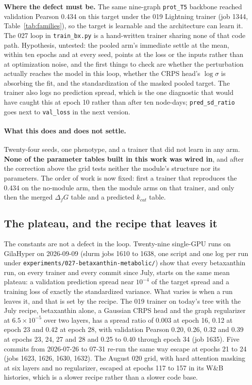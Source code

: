 \textbf{Where the defect must be.} The same nine-graph \texttt{prot\_T5} backbone reached
validation Pearson 0.434 on this target under the 019 Lightning trainer (job 1344,
Table~\ref{tab:families}), so the target is learnable and the architecture can learn it.
The 027 loop in \texttt{train\_bx.py} is a hand-written trainer sharing none of that code
path. Hypothesis, untested: the pooled arm's immediate settle at the mean, within ten
epochs and at every seed, points at the loss or the inputs rather than at optimization
noise, and the first things to check are whether the perturbation actually reaches the
model in this loop, whether the CRPS head's $\log\sigma$ is absorbing the fit, and the
standardization of the masked pooled target. The trainer also logs no prediction spread,
which is the one diagnostic that would have caught this at epoch 10 rather than after
ten node-days; \texttt{pred\_sd\_ratio} goes next to \texttt{val\_loss} in the next
version.

\paragraph{What this does and does not settle.} Twenty-four seeds, one phenotype, and a
trainer that did not learn in any arm. \textbf{None of the parameter tables built in this
work was wired in}, and after the correction above the grid tests neither the module's
structure nor its parameters. The order of work is now fixed: first a trainer that
reproduces the 0.434 on the no-module arm, then the module arms on that trainer, and only
then the merged $\Delta_f G$ table and a predicted $k_{cat}$ table.

\subsection{The plateau, and the recipe that leaves it}
\label{sec:plateau}

The constants are not a defect in the loop. Twenty-nine single-GPU runs on GilaHyper on
2026-09-09 (slurm jobs 1610 to 1638, one script and one log per run under
\texttt{experiments/027-betaxanthin-metabolic/}) show that every betaxanthin run, on every
trainer and every commit since July, starts on the same mean plateau: a validation
prediction spread near $10^{-4}$ of the target spread and a training loss of exactly the
standardized variance. What varies is when a run leaves it, and that is set by the recipe.
The 019 trainer on today's tree with the July recipe, betaxanthin alone, a Gaussian CRPS head
and the graph regularizer at $6.5\times10^{-5}$ over two layers, has a spread ratio of 0.003
at epoch 16, 0.12 at epoch 23 and 0.42 at epoch 28, with validation Pearson 0.20, 0.26, 0.32
and 0.39 at epochs 23, 24, 27 and 28 and 0.25 to 0.40 through epoch 34 (job 1635). Five
commits from 2026-07-26 to 07-31 re-run the same way escape at epochs 21 to 24 (jobs 1623,
1626, 1630, 1632). The August 020 grid, with hard attention masking at six layers and no
regularizer, escaped at epochs 117 to 157 in its W\&B histories, which is a slower recipe
rather than a slower code base.

